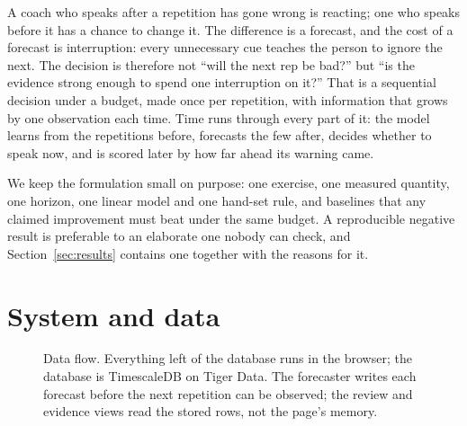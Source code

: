 \documentclass[11pt,a4paper]{article}
\begin{document}
A coach who speaks after a repetition has gone wrong is reacting; one who speaks before it has a chance to change it. The difference is a forecast, and the cost of a forecast is interruption: every unnecessary cue teaches the person to ignore the next. The decision is therefore not ``will the next rep be bad?'' but ``is the evidence strong enough to spend one interruption on it?'' That is a sequential decision under a budget, made once per repetition, with information that grows by one observation each time. Time runs through every part of it: the model learns from the repetitions before, forecasts the few after, decides whether to speak now, and is scored later by how far ahead its warning came.

We keep the formulation small on purpose: one exercise, one measured quantity, one horizon, one linear model and one hand-set rule, and baselines that any claimed improvement must beat under the same budget. A reproducible negative result is preferable to an elaborate one nobody can check, and Section~\ref{sec:results} contains one together with the reasons for it.

\section{System and data}

\begin{figure}[t]
\centering
{}
\caption{Data flow. Everything left of the database runs in the browser; the database is TimescaleDB on Tiger Data. The forecaster writes each forecast before the next repetition can be observed; the review and evidence views read the stored rows, not the page's memory.}
\label{fig:system}
\end{figure}
\end{document}

